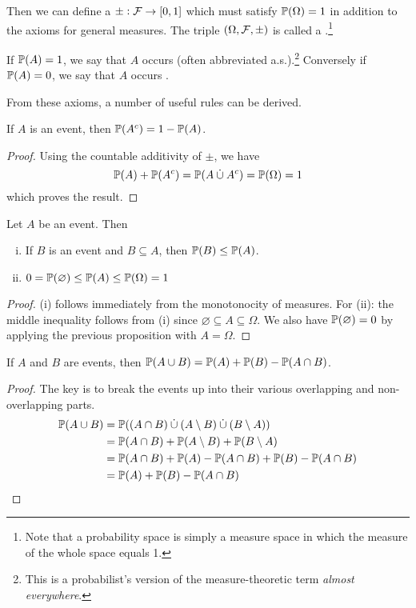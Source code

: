 \documentclass{article}
\begin{document}
Then we can define a  $\pm : \mathcal{F} \to [0,1]$ which must satisfy $\mathbb{P}(\Omega) = 1$ in addition to the axioms for general measures.
The triple $(\Omega, \mathcal{F}, \pm)$ is called a .\footnote{
    Note that a probability space is simply a measure space in which the measure of the whole space equals 1.
}

If $\mathbb{P}(A) = 1$, we say that $A$ occurs  (often abbreviated a.s.).\footnote{
    This is a probabilist's version of the measure-theoretic term \textit{almost everywhere}.
}
Conversely if $\mathbb{P}(A) = 0$, we say that $A$ occurs .

From these axioms, a number of useful rules can be derived.
\begin{proposition}
If $A$ is an event, then $\mathbb{P}(A^c) = 1 - \mathbb{P}(A)$.
\end{proposition}
\begin{proof}
Using the countable additivity of $\pm$, we have
\[\mathbb{P}(A) + \mathbb{P}(A^c) = \mathbb{P}(A \mathbin{\dot{\cup}} A^c) = \mathbb{P}(\Omega) = 1\]
which proves the result.
\end{proof}

\begin{proposition}
Let $A$ be an event. Then
\begin{enumerate}[(i)]
\item If $B$ is an event and $B \subseteq A$, then $\mathbb{P}(B) \leq \mathbb{P}(A)$.
\item $0 = \mathbb{P}(\varnothing) \leq \mathbb{P}(A) \leq \mathbb{P}(\Omega) = 1$
\end{enumerate}
\end{proposition}
\begin{proof}
(i) follows immediately from the monotonocity of measures.
For (ii): the middle inequality follows from (i) since $\varnothing \subseteq A \subseteq \Omega$.
We also have $\mathbb{P}(\varnothing) = 0$ by applying the previous proposition with $A = \Omega$.
\end{proof}

\begin{proposition}
If $A$ and $B$ are events, then $\mathbb{P}(A \cup B) = \mathbb{P}(A) + \mathbb{P}(B) - \mathbb{P}(A \cap B)$.
\end{proposition}
\begin{proof}
The key is to break the events up into their various overlapping and non-overlapping parts.
\begin{align*}
\mathbb{P}(A \cup B) &= \mathbb{P}((A \cap B) \mathbin{\dot{\cup}} (A \setminus B) \mathbin{\dot{\cup}} (B \setminus A)) \\
&= \mathbb{P}(A \cap B) + \mathbb{P}(A \setminus B) + \mathbb{P}(B \setminus A) \\
&= \mathbb{P}(A \cap B) + \mathbb{P}(A) - \mathbb{P}(A \cap B) + \mathbb{P}(B) - \mathbb{P}(A \cap B) \\
&= \mathbb{P}(A) + \mathbb{P}(B) - \mathbb{P}(A \cap B)
\end{align*}
\end{proof}
\end{document}
